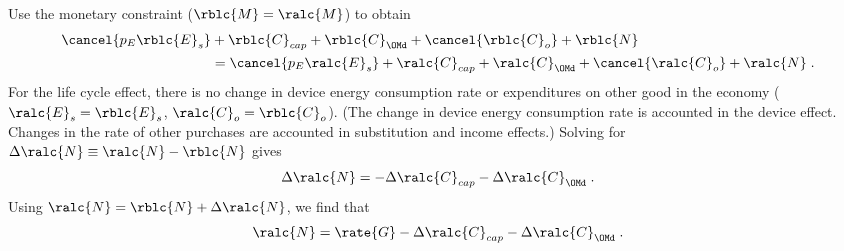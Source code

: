 \begin{landscape}
{Use the monetary constraint ($\rblc{M} = \ralc{M}$) to obtain
%
\begin{align} \label{M_dot_bal_lc}
  \cancel{p_E \rblc{E}_s} &+ \rblc{C}_{cap} + \rblc{C}_{\OMd} + \cancel{\rblc{C}_o} + \rblc{N} \nonumber \\
                          &= \cancel{p_E \ralc{E}_s} + \ralc{C}_{cap} + \ralc{C}_{\OMd} + \cancel{\ralc{C}_o}  + \ralc{N} \; .
\end{align}
%
For the life cycle effect, 
there is no change in device energy consumption rate or expenditures on other good in the economy 
($\ralc{E}_s = \rblc{E}_s$, $\ralc{C}_o = \rblc{C}_o$).
(The change in device energy consumption rate is accounted in the device effect.
Changes in the rate of other purchases are accounted in substitution and income effects.)
Solving for $\Delta \ralc{N} \equiv \ralc{N} - \rblc{N}$ gives
%
\begin{equation}
  \Delta \ralc{N} = - \Delta \ralc{C}_{cap} - \Delta \ralc{C}_{\OMd} \; .
\end{equation}
%
Using $\ralc{N} = \rblc{N} + \Delta \ralc{N}$, we find that
%
\begin{equation}
  \ralc{N} = \rate{G} - \Delta \ralc{C}_{cap} - \Delta \ralc{C}_{\OMd} \; .
\end{equation}
%
}

\end{landscape}